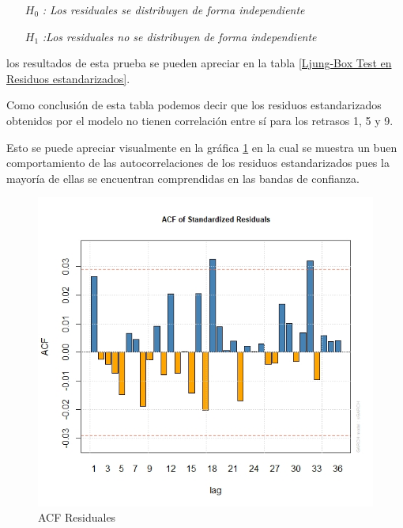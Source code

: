  \begin{itemize}
  \centering
    \item[$H_{0}$] \textit{: Los residuales se distribuyen de forma independiente } 
    \item [$H_{1}$] \textit{:Los residuales no se distribuyen de forma independiente }
 \end{itemize}
 \bigskip
los resultados de esta prueba se pueden apreciar en la tabla \ref{Ljung-Box Test en Residuos estandarizados}.
\bigskip





Como conclusión de esta tabla podemos decir que los residuos estandarizados obtenidos por el modelo no tienen correlación entre sí para los retrasos  1, 5 y 9. 
\\
\newpage
 
Esto se puede apreciar visualmente en la gráfica \ref{ACF Residuales} en la cual se muestra un buen comportamiento de las autocorrelaciones de los residuos estandarizados pues la mayoría de ellas se encuentran comprendidas en las bandas de confianza.


\begin{figure}[h]
    \centering
    \includegraphics[scale=.4]{Graficos/ACF Residuales sta.jpeg}
    \caption{ACF Residuales}
    \label{ACF Residuales}
\end{figure}

